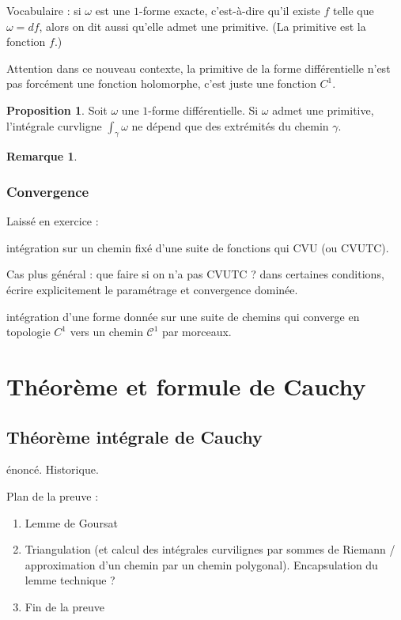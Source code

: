 \documentclass[11pt,a4paper]{book}
\theoremstyle{definition}
\newtheorem{proposition}[theoreme]{Proposition}
\theoremstyle{plain}
\newtheorem{remarque}[theoreme]{Remarque}
\begin{document}
Vocabulaire : si $\omega$ est une $1$-forme exacte,  c'est-à-dire qu'il existe $f$ telle que $\omega=df$, alors on dit aussi qu'elle admet une primitive. (La primitive est la fonction $f$.)

Attention dans ce nouveau contexte, la primitive de la forme différentielle n'est pas forcément  une fonction holomorphe, c'est juste une fonction $C^1$.

\begin{proposition}
Soit $\omega$ une $1$-forme différentielle.
Si $\omega$ admet une primitive, l'intégrale curvligne  $\int_\gamma \omega$ ne dépend que des extrémités du chemin $\gamma$.
\end{proposition}

\begin{remarque}
\end{remarque}

\subsection{Convergence}

Laissé en exercice : 

intégration sur un chemin fixé d'une suite de fonctions qui CVU (ou CVUTC).

Cas plus général : que faire si on n'a pas CVUTC ? dans certaines conditions, écrire explicitement le paramétrage et convergence dominée.

intégration d'une forme donnée sur une suite de chemins qui converge en topologie $C^1$ vers un chemin $\mathcal C^1$ par morceaux.




\chapter{Théorème et formule de Cauchy}

\section{Théorème intégrale de Cauchy}

énoncé. Historique.

Plan de la preuve : 
\begin{enumerate}
\item Lemme de Goursat
\item Triangulation (et calcul des intégrales curvilignes par sommes de Riemann / approximation d'un chemin par un chemin polygonal). Encapsulation du lemme technique ?
\item Fin de la preuve
\end{enumerate}
\end{document}
